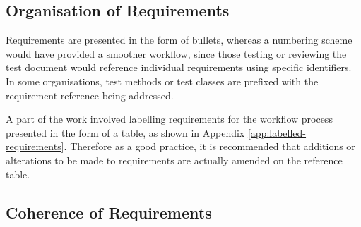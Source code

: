 \subsection{Organisation of Requirements}
Requirements are presented in the form of bullets, whereas a numbering scheme would have provided a smoother workflow, since those testing or reviewing the test document would reference individual requirements using specific identifiers.  In some organisations, test methods or test classes are prefixed with the requirement reference being addressed.
\par
A part of the work involved labelling requirements for the workflow process presented in the form of a table, as shown in Appendix \ref{app:labelled-requirements}.  Therefore as a good practice, it is recommended that additions or alterations to be made to requirements are actually amended on the reference table.



\subsection{Coherence of Requirements}

